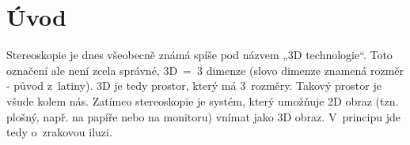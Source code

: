 \documentclass{article}
\begin{document}

\setlength{\parindent}{5ex}

\section*{Úvod}
Stereoskopie je dnes všeobecně známá spíše pod názvem „3D technologie“. Toto označení ale není zcela správné, 3D~=~3 dimenze (slovo dimenze znamená rozměr - původ z~latiny). 3D je tedy prostor, který má 3~rozměry. Takový prostor je všude kolem nás. Zatímco stereoskopie je systém, který umožňuje 2D obraz (tzn. plošný, např. na papíře nebo na monitoru) vnímat jako 3D obraz. V~principu jde tedy o~zrakovou iluzi.
\end{document}
